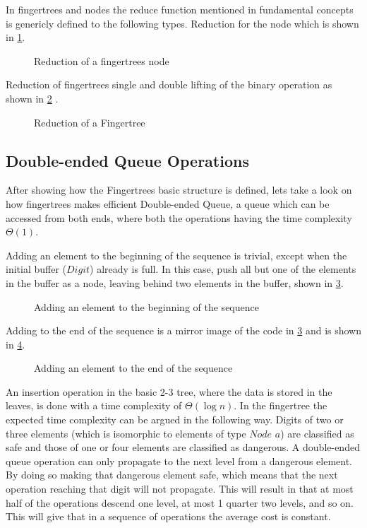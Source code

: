 In fingertrees and nodes the reduce function mentioned in fundamental concepts
is genericly defined to the following types. 
Reduction for the node which is shown in \cref{fig:reductionNode}.

\begin{figure}[h!]

\caption{Reduction of a fingertrees node \label{fig:reductionNode}}
\end{figure}

Reduction of fingertrees single and double lifting of the binary operation as
shown in \cref{fig:reductionFingerTree}
\cite{fingertree}.

\begin{figure}[h!]

\caption{Reduction of a Fingertree \label{fig:reductionFingerTree}}
\end{figure}

\subsection{Double-ended Queue Operations}
After showing how the Fingertrees basic structure is defined, lets take a look
on how fingertrees makes efficient Double-ended Queue, a queue which can be
accessed from both ends, where both the operations having the time complexity
$\Theta(1)$.

Adding an element to the beginning of the sequence is trivial, except
when the initial buffer ($Digit$) already is full. In this case, push all but
one of the elements in the buffer as a node, leaving behind two elements in the
buffer, shown in \cref{fig:AddFirst}.

\begin{figure}[h!]

\caption{Adding an element to the beginning of the sequence \label{fig:AddFirst}}
\end{figure}

Adding to the end of the sequence is a mirror image of the code in
\cref{fig:AddFirst} and is shown in \cref{fig:AddLast}.

\begin{figure}[h!]

\caption{Adding an element to the end of the sequence \label{fig:AddLast}}
\end{figure}

An insertion operation in the basic 2-3 tree, where the data is stored in the
leaves, is done with a time complexity of $\Theta (\log n)$. In the fingertree
the expected time complexity can be argued in the following way. Digits of two
or three elements (which is isomorphic to elements of type $Node$ $a$) are
classified as safe and those of one or four elements are classified as dangerous.
A double-ended queue operation can only propagate to the next level from a
dangerous element. By doing so making that dangerous element safe, which means
that the next operation reaching that digit will not propagate. This will result
in that at most half of the operations descend one level, at most 1 quarter two
levels, and so on. This will give that in a sequence of operations the average
cost is constant.

